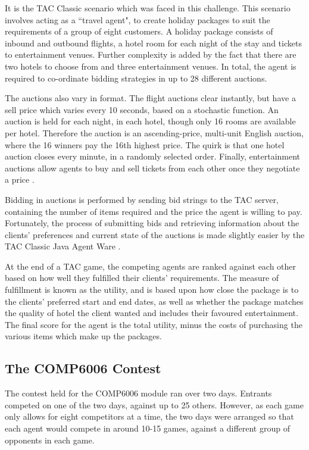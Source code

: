 \documentclass{acm_proc_article-sp}
\begin{document}
 It is the TAC Classic scenario which was faced in this challenge.  This scenario involves acting as a ``travel agent", to create holiday packages to suit the requirements of a group of eight customers.  A holiday package consists of inbound and outbound flights, a hotel room for each night of the stay and tickets to entertainment venues.  Further complexity is added by the fact that there are two hotels to choose from and three entertainment venues.  In total, the agent is required to co-ordinate bidding strategies in up to 28 different auctions.
 
 The auctions also vary in format.  The flight auctions clear instantly, but have a sell price which varies every 10 seconds, based on a stochastic function.  An auction is held for each night, in each hotel, though only 16 rooms are available per hotel.  Therefore the auction is an ascending-price, multi-unit English auction, where the 16 winners pay the 16th highest price.  The quirk is that one hotel auction closes every minute, in a randomly selected order.  Finally, entertainment auctions allow agents to buy and sell tickets from each other once they negotiate a price \cite{SICS2007b}.
 
 Bidding in auctions is performed by sending bid strings to the TAC server, containing the number of items required and the price the agent is willing to pay.  Fortunately, the process of submitting bids and retrieving information about the clients' preferences and current state of the auctions is made slightly easier by the TAC Classic Java Agent Ware \cite{SICS2007c}.
 
 At the end of a TAC game, the competing agents are ranked against each other based on how well they fulfilled their clients' requirements.  The measure of fulfillment is known as the utility, and is based upon how close the package is to the clients' preferred start and end dates, as well as whether the package matches the quality of hotel the client wanted and includes their favoured entertainment.  The final score for the agent is the total utility, minus the costs of purchasing the various items which make up the packages.
 
 \subsection{The COMP6006 Contest}
 
 The contest held for the COMP6006 module ran over two days.  Entrants competed on one of the two days, against up to 25 others.  However, as each game only allows for eight competitors at a time, the two days were arranged so that each agent would compete in around 10-15 games, against a different group of opponents in each game.
 
\end{document}

